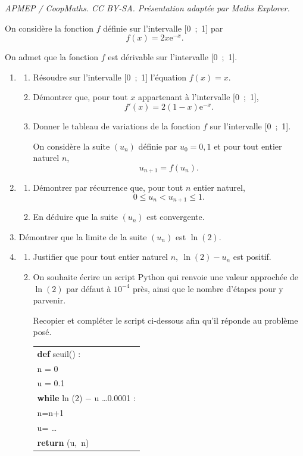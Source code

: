 \documentclass[10pt]{article}
\providecommand{\e}{{\mathrm{e}}}
\begin{document}
\noindent\textit{APMEP / CoopMaths. CC BY-SA. Présentation adaptée par Maths Explorer.}\par\medskip
\medskip

On considère la fonction $f$ définie sur l'intervalle [0~;~1] par 
\[f(x) = 2x\e^{-x}.\]

On admet que la fonction $f$ est dérivable sur l'intervalle [0~;~1]. 

\medskip

\begin{enumerate}
\item 
	\begin{enumerate}
		\item Résoudre sur l'intervalle [0~;~1] l'équation $f(x) = x$.
		\item Démontrer que, pour tout $x$ appartenant à l'intervalle [0~;~1], 
		\[f'(x) = 2(1 - x)\e^{-x}.\]
		
		\item Donner le tableau de variations de la fonction $f$ sur l'intervalle [0~;~1].
		
On considère la suite $\left(u_n\right)$ définie par $u_0 = 0,1$ et pour tout entier naturel $n$,
\[u_{n+1} = f\left(u_n\right).\]
	\end{enumerate}
\item 
	\begin{enumerate}
		\item Démontrer par récurrence que, pour tout $n$ entier naturel,
		\[0 \leqslant u_n < u_{n+1} \leqslant 1.\]
		
		\item En déduire que la suite $\left(u_n\right)$ est convergente.
	\end{enumerate}
\item Démontrer que la limite de la suite $\left(u_n\right)$ est $\ln (2)$.
\item 
	\begin{enumerate}
		\item Justifier que pour tout entier naturel $n,\: \ln (2) - u_n$ est positif.
		\item On souhaite écrire un script Python qui renvoie une valeur approchée de $\ln(2)$ par défaut à $10^{-4}$ près, ainsi que le nombre d'étapes pour y parvenir.
		
Recopier et compléter le script ci-dessous afin qu'il réponde au problème posé.

\begin{center}
\begin{tabular}{|l|}\hline
\textbf{def} seuil() :\\
\qquad n = 0\\
\qquad u = 0.1\\
\qquad \textbf{while} ln (2) $-$ u \ldots 0.0001 :\\
\qquad \qquad n=n+1\\
\qquad \qquad u= \ldots\\
\qquad \textbf{return} (u,~n)\\ \hline
\end{tabular}
\end{center}


\end{enumerate}
\end{enumerate}
\end{document}
